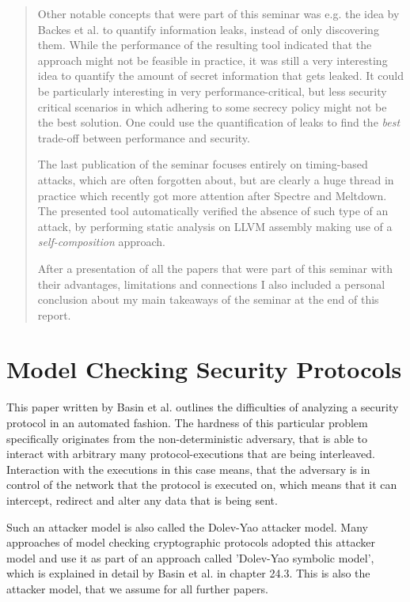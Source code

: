 \documentclass[a4paper,UKenglish]{lipics-v2018}
\begin{document}
\begin{abstract}
Other notable concepts that were part of this seminar was e.g. the idea by Backes et al. to quantify information leaks, instead of only discovering them. While the performance of the resulting tool indicated that the approach might not be feasible in practice, it was still a very interesting idea to quantify the amount of secret information that gets leaked. It could be particularly interesting in very performance-critical, but less security critical scenarios in which adhering to some secrecy policy might not be the best solution. One could use the quantification of leaks to find the \textit{best} trade-off between performance and security.

The last publication of the seminar focuses entirely on timing-based attacks, which are often forgotten about, but are clearly a huge thread in practice which recently got more attention after Spectre and Meltdown. The presented tool automatically verified the absence of such type of an attack, by performing static analysis on LLVM assembly making use of a \textit{self-composition} approach.

After a presentation of all the papers that were part of this seminar with their advantages, limitations and connections I also included a personal conclusion about my main takeaways of the seminar at the end of this report.
\end{abstract}



\section{Model Checking Security Protocols}

This paper written by Basin et al. outlines the difficulties of analyzing a security protocol in an automated fashion. The hardness of this particular problem specifically originates from the non-deterministic adversary, that is able to interact with arbitrary many protocol-executions that are being interleaved. Interaction with the executions in this case means, that the adversary is in control of the network that the protocol is executed on, which means that it can intercept, redirect and alter any data that is being sent.\cite{model_checking_security_protocols}

Such an attacker model is also called the Dolev-Yao attacker model.  Many approaches of model checking cryptographic protocols adopted this attacker model and use it as part of an approach called 'Dolev-Yao symbolic model', which is explained in detail by Basin et al. in chapter 24.3.\cite{model_checking_security_protocols} 
This is also the attacker model, that we assume for all further papers.
\end{document}
